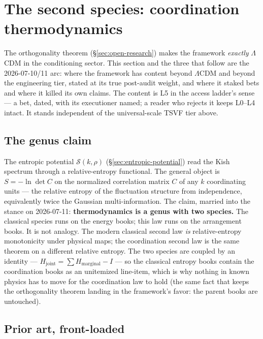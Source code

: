 \documentclass[11pt,a4paper]{article}
\begin{document}
\section{The second species: coordination thermodynamics}\label{sec:second-species}

The orthogonality theorem (\S\ref{sec:open-research}) makes the framework \emph{exactly} $\Lambda$CDM in the conditioning sector. This section and the three that follow are the 2026-07-10/11 arc: where the framework has content beyond $\Lambda$CDM and beyond the engineering tier, stated at its true post-audit weight, and where it staked bets and where it killed its own claims. The content is L5 in the access ladder's sense --- a bet, dated, with its executioner named; a reader who rejects it keeps L0--L4 intact. It stands independent of the universal-scale TSVF tier above.

\subsection*{The genus claim}

The entropic potential $\mathcal{S}(k,\rho)$ (\S\ref{sec:entropic-potential}) read the Kish spectrum through a relative-entropy functional. The general object is $S = -\ln\det C$ on the normalized correlation matrix $C$ of any $k$ coordinating units --- the relative entropy of the fluctuation structure from independence, equivalently twice the Gaussian multi-information. The claim, married into the stance on 2026-07-11: \textbf{thermodynamics is a genus with two species.} The classical species runs on the energy books; this law runs on the arrangement books. It is not analogy. The modern classical second law \emph{is} relative-entropy monotonicity under physical maps; the coordination second law is the same theorem on a different relative entropy. The two species are coupled by an identity --- $H_{\text{joint}} = \sum H_{\text{marginal}} - I$ --- so the classical entropy books contain the coordination books as an unitemized line-item, which is why nothing in known physics has to move for the coordination law to hold (the same fact that keeps the orthogonality theorem landing in the framework's favor: the parent books are untouched).

\subsection*{Prior art, front-loaded}
\end{document}
